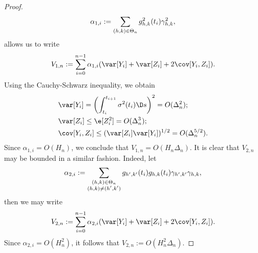 \begin{appendices}
\begin{proof}
\begin{align}
  \alpha_{1,i} := \sum_{(h,k) \in \Theta_n} g^2_{h,k}(t_i)\gamma_{h,k}^2,\notag
  \label{}
\end{align}
allows us to write 
\begin{align}
  V_{1,n} := \sum_{i = 0}^{n-1} \alpha_{1,i} (\var[Y_i] + \var[Z_i] + 2 \cov[Y_i,Z_i]). \notag
  \label{}
\end{align}
Using the Cauchy-Schwarz inequality, we obtain 
\begin{align}
    &\var[Y_i] = \left(\int^{t_{i+1}}_{t_i} \sigma^2(t_i) \D s\right)^2 = O(\Delta_n^2);\\
    &\var[Z_i] \le \e[Z_i^2] = O(\Delta_n^3); \\
    &\cov[Y_i, Z_i] \le (\var[Z_i] \var[Y_i])^{1/2} = O(\Delta_n^{5/2}).
\end{align}
Since $\alpha_{1,i} = O(H_n)$, we conclude that  $V_{1,n} = O(H_n\Delta_n)$. It is clear that $V_{2,n}$ may be bounded in a similar fashion. Indeed, let
\begin{align}
  \alpha_{2,i} := \sum_{\substack{(h,k) \in \Theta_n\\ (h,k) \ne (h',k')}} g_{h',k'}(t_i)g_{h,k}(t_i)\gamma_{h',k'}\gamma_{h,k},\notag
  \label{}
\end{align}
then we may write
\begin{align}
  V_{2,n} := \sum_{i = 0}^{n-1} \alpha_{2,i} (\var[Y_i] + \var[Z_i] + 2 \cov[Y_i,Z_i]). \notag
  \label{}
\end{align}
Since $ \alpha_{2,i} = O(H_n^2)$, it follows that $V_{2,n} := O(H^2_n\Delta_n)$. 
\end{proof}

\end{appendices}
